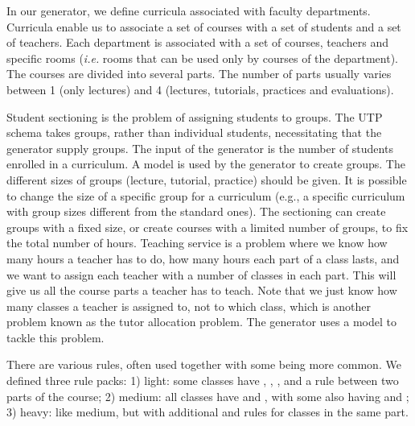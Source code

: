 \documentclass[runningheads]{llncs}
\begin{document}
 












In our generator, we define curricula associated with faculty departments.
Curricula enable us to associate a set of courses with a set of students and a set of teachers.
Each department is associated with a set of courses, teachers and specific rooms (\emph{i.e.} rooms that can be used only by courses of the department).
The courses are divided into several parts.
The number of parts usually varies between 1 (only lectures) and 4 (lectures, tutorials, practices and evaluations).







Student sectioning is the problem of assigning students to groups.
The UTP schema takes groups, rather than individual students, necessitating that the generator supply groups.
The input of the generator is the number of students enrolled in a curriculum.
A \CSP{} model is used by the generator to create groups.
The different sizes of groups (lecture, tutorial, practice) should be given.
It is possible to change the size of a specific group for a curriculum (e.g., a specific curriculum with group sizes different from the standard ones).
The sectioning \CSP{} can create groups with a fixed size, or create courses with a limited number of groups, to fix the total number of hours. 
Teaching service is a problem where we know how many hours a teacher has to do, how many hours each part of a class lasts, and we want to assign each teacher with a number of classes in each part.
This will give us all the course parts a teacher has to teach. Note that we just know how many classes a teacher is assigned to, not to which class, which is another problem
known as the tutor allocation problem.
The generator uses a \CSP{} model to tackle this problem.




There are various rules, often used together with some being more common. We defined three rule packs: 1) light: some classes have \texttt{\SAMEROOMS{}}, \texttt{\SAMETEACHERS{}}, \texttt{\PERIODIC{}}, and a \texttt{\SEQUENCED{}} rule between two parts of the course; 2) medium: all classes have \texttt{\SAMEROOMS{}} and \texttt{\SAMETEACHERS{}}, with some also having \texttt{\PERIODIC{}} and \texttt{\SEQUENCED{}}; 3) heavy: like medium, but with additional \texttt{\SAMETEACHERS{}} and \texttt{\SAMESLOT{}} rules for classes in the same part.
\end{document}
